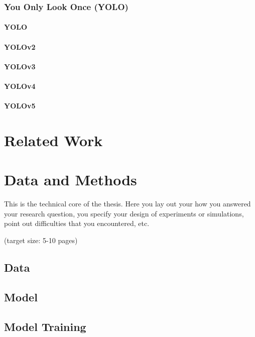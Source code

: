 \documentclass[a4paper,11pt,oneside]{article}
\begin{document}
  \subsubsection{You Only Look Once (YOLO)}

  \paragraph{YOLO}
  \paragraph{YOLOv2}
  \paragraph{YOLOv3}
  \paragraph{YOLOv4}
  \paragraph{YOLOv5}

  \section{Related Work}


  \section{Data and Methods}

  This is the technical core of the thesis. Here you lay out your how
  you answered your research question, you specify your design of
  experiments or simulations, point out difficulties that you
  encountered, etc.

  (target size: 5-10 pages)

  \subsection{Data}
  \subsection{Model}
  \subsection{Model Training}
\end{document}
